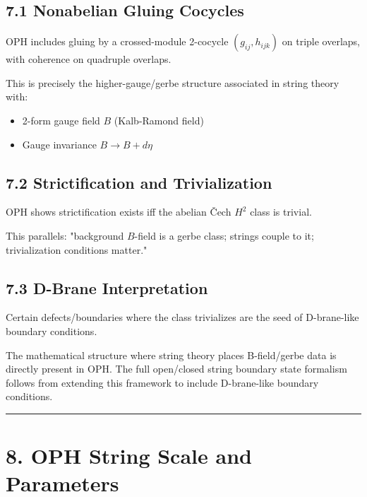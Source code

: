 \subsection{7.1 Nonabelian Gluing Cocycles}\label{71-nonabelian-gluing-cocycles}

OPH includes gluing by a crossed-module 2-cocycle \((g_{ij}, h_{ijk})\) on triple overlaps, with coherence on quadruple overlaps.

This is precisely the higher-gauge/gerbe structure associated in string theory with:

\begin{itemize}
\tightlist
\item
  2-form gauge field \(B\) (Kalb-Ramond field)
\item
  Gauge invariance \(B \to B + d\eta\)
\end{itemize}

\subsection{7.2 Strictification and Trivialization}\label{72-strictification-and-trivialization}

OPH shows strictification exists iff the abelian \v{C}ech \(H^2\) class is trivial.

This parallels: "background \(B\)-field is a gerbe class; strings couple to it; trivialization conditions matter."

\subsection{7.3 D-Brane Interpretation}\label{73-d-brane-interpretation}

Certain defects/boundaries where the class trivializes are the seed of D-brane-like boundary conditions.

The mathematical structure where string theory places B-field/gerbe data is directly present in OPH. The full open/closed string boundary state formalism follows from extending this framework to include D-brane-like boundary conditions.

\begin{center}\rule{0.5\linewidth}{0.5pt}\end{center}

\section{8. OPH String Scale and Parameters}\label{8-oph-string-scale-and-parameters}

